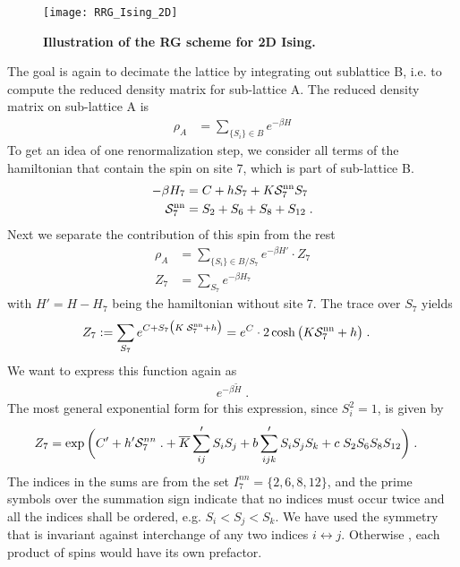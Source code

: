 %
\begin{figure}[htbp]
\begin{center}
\texttt{[image: RRG\_Ising\_2D]}
\caption{\bf Illustration of the RG scheme for 2D Ising. 
}
\label{fig:rng:ising:2d} 
\end{center}
\end{figure}
%
The goal is again to decimate the lattice by integrating out sublattice B, i.e.
to compute the reduced density matrix for sub-lattice A.
The reduced density matrix on sub-lattice A is
%
\begin{align*}
\rho_{A} &= \sum_{\{S_{i}\}\in B} e^{-\beta H}
\end{align*}
%
To get an idea of one renormalization step,
we consider all terms of the hamiltonian that contain the spin on site 7, which is part of sub-lattice B.
%
\newcommand{\Snn}{{\cal S}^\text{nn}_{7}}
\newcommand{\Snnn}{{\cal S}^\text{nnn}_{7}}
\begin{align*}
-\beta H_{7} &= C + h S_{7} + K \Snn S_{7 }\\
\Snn &= S_{2} + S_{6} + S_{8} + S_{12}\;.
\end{align*}
%
Next we separate the contribution of this spin from the rest
%
\begin{align*}
\rho_{A} &= \sum_{\{S_{i}\}\in B / S_{7}} e^{-\beta H'} \cdot Z_{7}\\
Z_{7} &= \sum_{S_{7}} e^{-\beta H_{7}}
\end{align*}
% 
with $H'=H-H_{7}$ being the hamiltonian without site 7.
The trace over $S_{7}$ yields
%
\begin{align}\label{eq:Z:7a}
Z_{7}:=
\sum_{S_{7}} e^{C + S_{7}\big( K \;\Snn +h\big) }
&= e^{C} \cdot 2\cosh\big(K \Snn  +h  \big)\;.
\end{align}
%
We want to express this function again as
%
\begin{align*}
e^{- \beta \tilde H}\;.
\end{align*}
%
The most general exponential form for this expression, since $S_{i}^{2}=1$, is given by
%
\begin{align}\label{eq:Z7}
Z_{7}&= \exp\bigg(C' + h' {\cal S}_{7}	^{nn}\;.
+ \overline{K} \sum'_{ij}  S_{i}S_{j}  +
b \sum'_{ijk} S_{i}S_{j} S_{k}  + c \; S_{2}S_{6}S_{8}S_{12}\bigg)\;.
\end{align}
%
The indices in the sums are from the set $I^{nn}_{7} =\{2,6,8,12\}$,
and the prime symbols over the summation sign indicate that  no indices must occur twice and all the indices shall be ordered, e.g. $S_{i}<S_{j}<S_{k}$. 
We have used the symmetry that 
is invariant against interchange of any two indices $i\leftrightarrow j$.
Otherwise , each product of spins would have its own prefactor.

